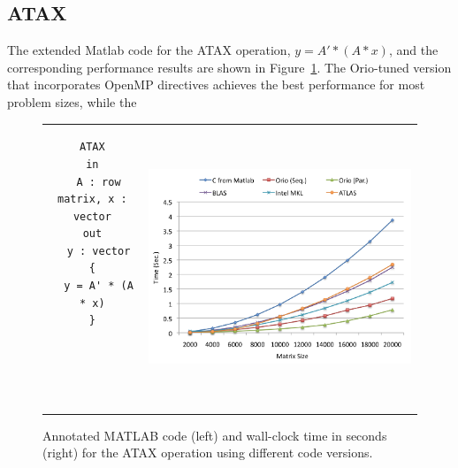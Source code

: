 \documentclass[11pt]{article}
\begin{document}
\subsection{ATAX}

The extended Matlab code for the ATAX operation, $y = A' * (A * x)$, and the corresponding performance results are shown in Figure~\ref{fig:atax}. The Orio-tuned version that incorporates OpenMP directives achieves the best performance for most problem sizes, while the



\begin{figure}[htp]
\centering
\begin{tabular}{cc}
\begin{minipage}[b]{.3\textwidth}
\footnotesize
\begin{verbatim}
ATAX
in
  A : row matrix, x : vector
out
  y : vector
{
  y = A' * (A * x)
}





\end{verbatim}
\end{minipage}
&
\begin{minipage}[b]{.6\textwidth}
\includegraphics[width=\textwidth]{figures/atax.png}
\end{minipage}\\
\end{tabular}
\caption{Annotated MATLAB code (left) and wall-clock time in seconds (right) for the ATAX operation using different code versions.}
\label{fig:atax}
\end{figure}
\end{document}
